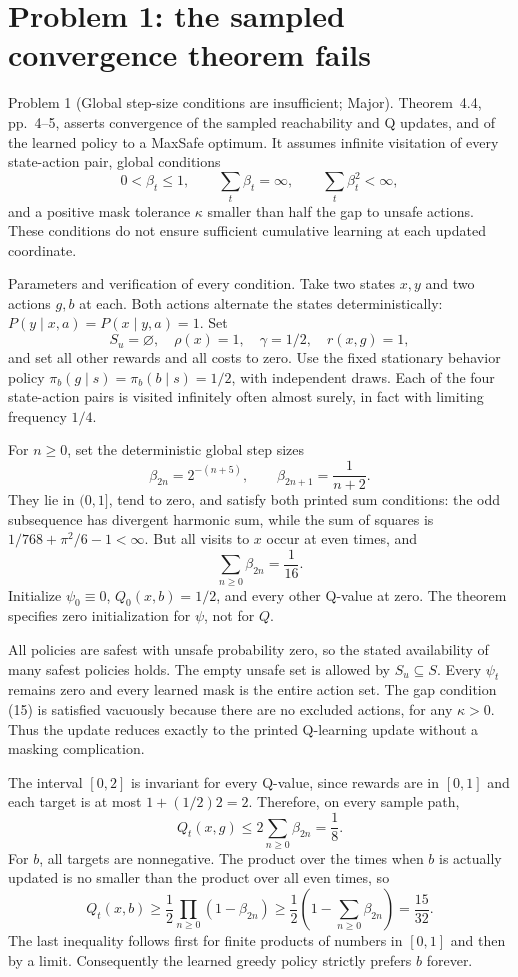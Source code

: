 \documentclass[10pt]{article}
\begin{document}
\section*{Problem 1: the sampled convergence theorem fails}
Problem 1 (Global step-size conditions are insufficient; Major).  Theorem 4.4, pp. 4–5, asserts convergence of the sampled reachability and Q updates, and of the learned policy to a MaxSafe optimum. It assumes infinite visitation of every state-action pair, global conditions \[0<\beta_t\leq1,\qquad \sum_t\beta_t=\infty,\qquad
 \sum_t\beta_t^2<\infty,\] and a positive mask tolerance \(\kappa\) smaller than half the gap to unsafe actions. These conditions do not ensure sufficient cumulative learning at each updated coordinate.\par
Parameters and verification of every condition. Take two states \(x,y\) and two actions \(g,b\) at each. Both actions alternate the states deterministically: \(P(y\mid x,a)=P(x\mid y,a)=1\). Set \[S_u=\varnothing,\quad \rho(x)=1,\quad \gamma=1/2,\quad
 r(x,g)=1,\] and set all other rewards and all costs to zero. Use the fixed stationary behavior policy \(\pi_b(g\mid s)=\pi_b(b\mid s)=1/2\), with independent draws. Each of the four state-action pairs is visited infinitely often almost surely, in fact with limiting frequency \(1/4\).\par
For \(n\geq0\), set the deterministic global step sizes \[\beta_{2n}=2^{-(n+5)},\qquad \beta_{2n+1}=\frac1{n+2}.\] They lie in \((0,1]\), tend to zero, and satisfy both printed sum conditions: the odd subsequence has divergent harmonic sum, while the sum of squares is \(1/768+\pi^2/6-1<\infty\). But all visits to \(x\) occur at even times, and \[\sum_{n\geq0}\beta_{2n}=\frac1{16}.\] Initialize \(\psi_0\equiv0\), \(Q_0(x,b)=1/2\), and every other Q-value at zero. The theorem specifies zero initialization for \(\psi\), not for \(Q\).\par
All policies are safest with unsafe probability zero, so the stated availability of many safest policies holds. The empty unsafe set is allowed by \(S_u\subseteq S\). Every \(\psi_t\) remains zero and every learned mask is the entire action set. The gap condition (15) is satisfied vacuously because there are no excluded actions, for any \(\kappa>0\). Thus the update reduces exactly to the printed Q-learning update without a masking complication.\par
The interval \([0,2]\) is invariant for every Q-value, since rewards are in \([0,1]\) and each target is at most \(1+(1/2)2=2\). Therefore, on every sample path, \[Q_t(x,g)\leq2\sum_{n\geq0}\beta_{2n}=\frac18.\] For \(b\), all targets are nonnegative. The product over the times when \(b\) is actually updated is no smaller than the product over all even times, so \[Q_t(x,b)\geq\frac12\prod_{n\geq0}(1-\beta_{2n})
 \geq\frac12\left(1-\sum_{n\geq0}\beta_{2n}\right)
 =\frac{15}{32}.\] The last inequality follows first for finite products of numbers in \([0,1]\) and then by a limit. Consequently the learned greedy policy strictly prefers \(b\) forever.\par
\end{document}
